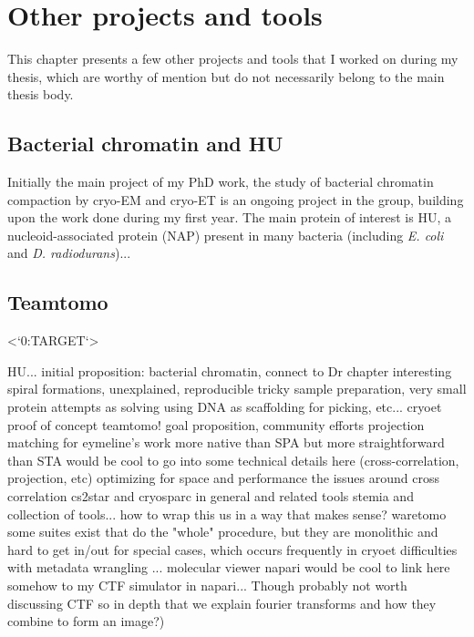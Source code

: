 \chapter{Other projects and tools}\label{other_projects}

This chapter presents a few other projects and tools that I worked on during my thesis, which are worthy of mention but do not necessarily belong to the main thesis body.

\section{Bacterial chromatin and HU}

Initially the main project of my PhD work, the study of bacterial chromatin compaction by cryo-EM and cryo-ET is an ongoing project in the group, building upon the work done during my first year.
The main protein of interest is HU, a nucleoid-associated protein (NAP) present in many bacteria (including \textit{E. coli} and \textit{D. radiodurans})...

\section{Teamtomo}
<`0:TARGET`>

\begin{outline}
\1 HU...
    \2 initial proposition: bacterial chromatin, connect to Dr chapter
    \2 interesting spiral formations, unexplained, reproducible
    \2 tricky sample preparation, very small protein
        \3 attempts as solving using DNA as scaffolding for picking, etc...
        \3 cryoet proof of concept
\1 teamtomo!
    \2 goal proposition, community efforts
\1 projection matching for eymeline's work
    \2 more native than SPA but more straightforward than STA
    \2 would be cool to go into some technical details here (cross-correlation, projection, etc)
    \2 optimizing for space and performance
    \2 the issues around cross correlation
\1 cs2star and cryosparc in general and related tools
\1 stemia and collection of tools... how to wrap this us in a way that makes sense?
\1 waretomo
    \2 some suites exist that do the "whole" procedure, but they are monolithic and hard to get in/out for special cases, which occurs frequently in cryoet
    \2 difficulties with metadata wrangling
    \2 ...
\1 molecular viewer napari
\1 would be cool to link here somehow to my CTF simulator in napari... Though probably not worth discussing CTF so in depth that we explain fourier transforms and how they combine to form an image?)
\end{outline}
